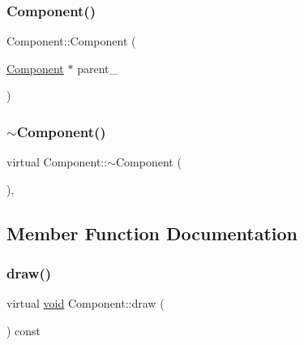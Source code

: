 \mbox{\label{classComponent_ad8fd006e351b2722c2e0f79010170a3c}} 
\subsubsection{\texorpdfstring{Component()}{Component()}\hspace{0.1cm}{\footnotesize\ttfamily [2/2]}}
{\footnotesize\ttfamily Component\+::\+Component (\begin{DoxyParamCaption}\item[{\hyperlink{classComponent}{Component} $\ast$}]{parent\+\_\+ }\end{DoxyParamCaption})\hspace{0.3cm}{\ttfamily [inline]}}

\mbox{\label{classComponent_ad82d7393e339c1b19cc17a0d55b5674d}} 
\subsubsection{\texorpdfstring{$\sim$\+Component()}{~Component()}\hspace{0.1cm}{\footnotesize\ttfamily [2/2]}}
{\footnotesize\ttfamily virtual Component\+::$\sim$\+Component (\begin{DoxyParamCaption}{ }\end{DoxyParamCaption})\hspace{0.3cm}{\ttfamily [virtual]}, {\ttfamily [default]}}



\subsection{Member Function Documentation}
\mbox{\label{classComponent_a8f45309003f02191f2bcc8864e8e9ecf}} 
\subsubsection{\texorpdfstring{draw()}{draw()}\hspace{0.1cm}{\footnotesize\ttfamily [1/2]}}
{\footnotesize\ttfamily virtual \hyperlink{imgui__impl__opengl3__loader_8h_ac668e7cffd9e2e9cfee428b9b2f34fa7}{void} Component\+::draw (\begin{DoxyParamCaption}{ }\end{DoxyParamCaption}) const\hspace{0.3cm}{\ttfamily [pure virtual]}}



